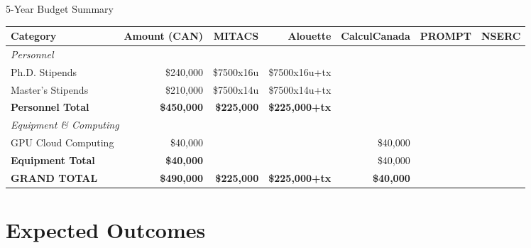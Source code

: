 \documentclass[aspectratio=169]{beamer}
\begin{document}
\begin{frame}{5-Year Budget Summary}


\vspace{0.2cm}
\begin{table}
\scriptsize
\begin{tabular}{|l|r|r|r|r|r|r|}
\hline
\rowcolor{primary!20}
\textbf{Category} & \textbf{Amount (CAN)} & \textbf{MITACS} & \textbf{Alouette} & CalculCanada & PROMPT & NSERC \\
\hline
\multicolumn{2}{|l|}{\textit{Personnel}} & & & & &\\
Ph.D. Stipends & \$240,000 & \$7500x16u & \$7500x16u+tx& & &\\
Master's Stipends & \$210,000 & \$7500x14u & \$7500x14u+tx& & &\\ 
\hline
\textbf{Personnel Total} & \textbf{\$450,000} & \textbf{\$225,000} & \textbf{\$225,000+tx} & & &\\
\hline
\multicolumn{2}{|l|}{\textit{Equipment \& Computing}} & & &  & &\\
GPU Cloud Computing & \$40,000 & & &\$40,000  & &\\
\hline
\textbf{Equipment Total} & \textbf{\$40,000} & & & \$40,000 & &\\
\hline
\hline
\textcolor{accent2}{\textbf{GRAND TOTAL}} & \textcolor{accent2}{\textbf{\$490,000}} & \textbf{\$225,000} & \textbf{\$225,000+tx} & \textbf{\$40,000}  & &\\
\hline
\end{tabular}
\end{table}


\end{frame}

\section{Expected Outcomes}
\end{document}
